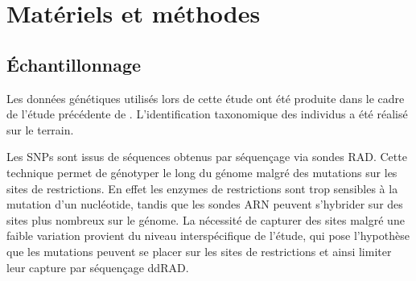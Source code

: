 \documentclass[12pt,a4paper,notitlepage]{article}
\begin{document}
\lipsum[1-2]


%
\section{Matériels et méthodes}

\subsection{Échantillonnage}

Les données génétiques utilisés lors de cette étude ont été produite dans le cadre de l'étude précédente de \citet{Boucher2016a}. L'identification taxonomique des individus a été réalisé sur le terrain.

Les SNPs sont issus de séquences obtenus par séquençage via sondes RAD. Cette technique permet de génotyper le long du génome malgré des mutations sur les sites de restrictions. En effet les enzymes de restrictions sont trop sensibles à la mutation d'un nucléotide, tandis que les sondes ARN peuvent s'hybrider sur des sites plus nombreux sur le génome. La nécessité de capturer des sites malgré une faible variation provient du niveau interspécifique de l'étude, qui pose l'hypothèse que les mutations peuvent se placer sur les sites de restrictions et ainsi limiter leur capture par séquençage ddRAD.

\end{document}
